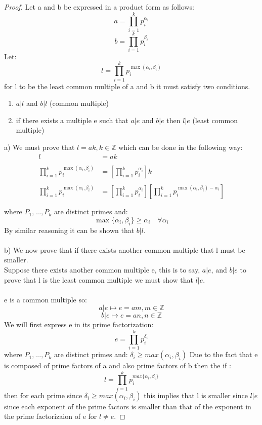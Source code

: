 \documentclass[11pt]{article}
\theoremstyle{definition}  %
\newcommand{\Z}{\mathbb{Z}}
\begin{document}
\begin{enumerate}
\begin{proof}
  Let a and b be expressed in a product form as follows:
  \[
    a=\prod_{i=1}^kp_i^{\alpha_i}
  \]
  \[
    b=\prod_{i=1}^kp_i^{\beta_i}
  \]
  Let:
  \[
    l=\prod_{i=1}^kp_i^{\max(\alpha_i,\beta_i)}
  \]
  for l to be the least common multiple of a and b it must satisfy two conditions.
  \begin{enumerate}
    \item $a|l$ and $b|l$ (common multiple)
    \item if there exists a multiple e such that $a|e$ and $b|e$ then $l|e$ (least common multiple)
  \end{enumerate}
a) We must prove that $l=ak,k\in \Z$ which can be done in the following way:
\begin{align*}
  l&=ak\\\\
  \prod_{i=1}^kp_i^{\max(\alpha_i,\beta_i)}&=\left[\prod_{i=1}^kp_i^{\alpha_i}\right]k\\\\
  \prod_{i=1}^kp_i^{\max(\alpha_i,\beta_i)}&=\left[\prod_{i=1}^kp_i^{\alpha_i}\right]\left[\prod_{i=1}^kp_i^{\max(\alpha_i,\beta_i)-\alpha_i}\right]\\\\
\end{align*}
where $P_1,...,P_k$ are distinct primes and:
 $$\max\{\alpha_i,\beta_i\}\geq \alpha_i \quad \forall \alpha_i$$
By similar reasoning it can be shown that $b|l$.\\\\
b) We now prove that if there exists another common multiple that l must be smaller.\\
Suppose there exists another common multiple e, this is to say, $a|e$, and $b|e$ to prove that l is the least common multiple we must show that $l|e$.\\\\
e is a common multiple so:
\[
  a|e\mapsto e=am,m\in \Z
\]
\[
  b|e\mapsto e=an,n\in \Z
\]
We will first express e in its prime factorization:
\[
  e=\prod_{i=1}^kp_i^{\delta_i}
\]
where $P_1,...,P_k$ are distinct primes and:
$\delta_i\geq max(\alpha_i,\beta_i)$
Due to the fact that e is composed of prime factors of a and also prime factors of b then the if :
\[
  l=\prod_{i=1}^kp_i^{max\{\alpha_i,\beta_i\}}
\]
then for each prime since $\delta_i\geq max(\alpha_i,\beta_i)$ this implies that l is smaller since $l|e$ since each exponent of the prime factors is smaller than that of the exponent in the prime factorizaion of e for $l\neq e$.
\end{proof}
 \end{enumerate}
\end{document}
